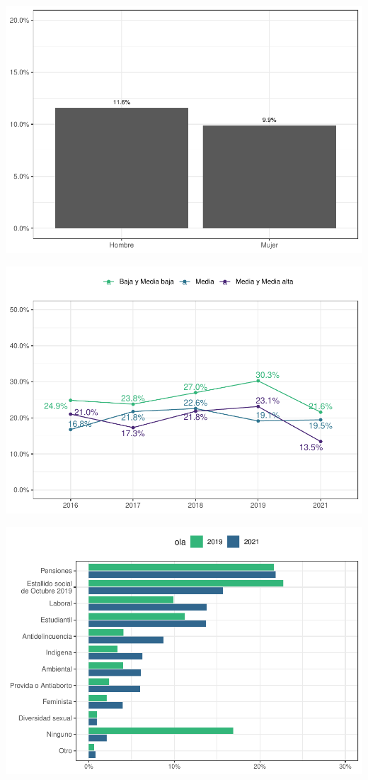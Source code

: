 \documentclass[
  12pt,
]{book}
\begin{document}
\begin{center}\includegraphics{reporte-elsoc_files/figure-latex/covid-sexo-1} \end{center}

\begin{center}\includegraphics{reporte-elsoc_files/figure-latex/depre clase.sub-1} \end{center}

\begin{center}\includegraphics{reporte-elsoc_files/figure-latex/unnamed-chunk-6-1} \end{center}
\end{document}
